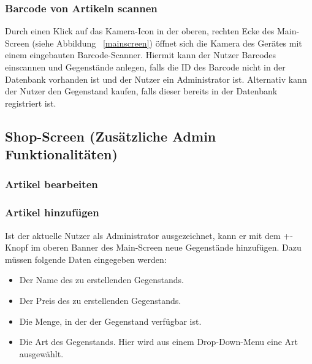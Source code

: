 

\subsubsection{Barcode von Artikeln scannen} \label{subsubsec:shop-scan-item}

Durch einen Klick auf das Kamera-Icon in der oberen, rechten Ecke des Main-Screen (siehe Abbildung ~\ref{mainscreen}) öffnet sich die Kamera des Gerätes mit einem eingebauten Barcode-Scanner.
Hiermit kann der Nutzer Barcodes einscannen und Gegenstände anlegen, falls die ID des Barcode nicht in der Datenbank vorhanden ist und der Nutzer ein Administrator ist.
Alternativ kann der Nutzer den Gegenstand kaufen, falls dieser bereits in der Datenbank registriert ist.

\subsection{Shop-Screen (Zusätzliche Admin Funktionalitäten)} \label{subsec:shop-admin}

\subsubsection{Artikel bearbeiten} \label{subsubsec:shop-edit-items}

\subsubsection{Artikel hinzufügen} \label{subsubsec:shop-add-items}

Ist der aktuelle Nutzer als Administrator ausgezeichnet, kann er mit dem +-Knopf im oberen Banner des Main-Screen neue Gegenstände hinzufügen.
Dazu müssen folgende Daten eingegeben werden:

\begin{itemize}
	\item Der Name des zu erstellenden Gegenstands.

	\item Der Preis des zu erstellenden Gegenstands.

	\item Die Menge, in der der Gegenstand verfügbar ist.

	\item Die Art des Gegenstands.
	Hier wird aus einem Drop-Down-Menu eine Art ausgewählt.
\end{itemize}

